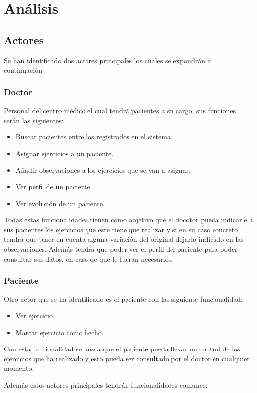 \section{Análisis}
\subsection{Actores}
Se han identificado dos actores principales los cuales se expondrán a continuación.

\subsubsection{Doctor}
Personal del centro médico el cual tendrá pacientes a su cargo, sus funciones serán
las siguientes:
\begin{itemize}
    \item Buscar pacientes entre los registrados en el sistema.
    \item Asignar ejercicios a un paciente.
    \item Añadir observaciones a los ejercicios que se van a asignar.
    \item Ver perfil de un paciente.
    \item Ver evolución de un paciente.
\end{itemize}

Todas estas funcionalidades tienen como objetivo que el docotor pueda indicarle a sus
pacientes los ejercicios que este tiene que realizar y si en su caso concreto tendrá
que tener en cuenta alguna variación del original dejarlo indicado en las observaciones.
Además tendrá que poder ver el perfil del paciente para poder consultar sus datos, en caso
de que le fueran necesarios.

\subsubsection{Paciente}
Otro actor que se ha identificado es el paciente con las siguiente funcionalidad:
\begin{itemize}
    \item Ver ejercicio.
    \item Marcar ejercicio como hecho.
\end{itemize}

Con esta funcionalidad se busca que el paciente pueda llevar un control de los ejercicios
que ha realizado y esto pueda ser consultado por el doctor en cualquier momento.

\medskip
Además estos actores principales tendrán funcionalidades comunes:


